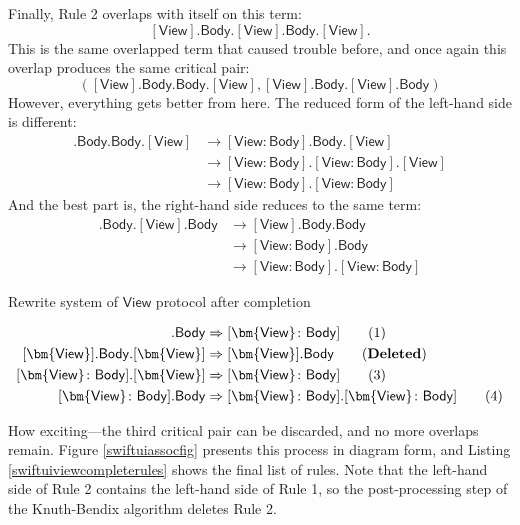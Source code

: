 \documentclass[headsepline,bibliography=totoc]{scrreport}
\newcommand{\namesym}[1]{\mathsf{#1}}
\newcommand{\proto}[1]{\bm{\mathsf{#1}}}
\newcommand{\protosym}[1]{[\proto{#1}]}
\newcommand{\assocsym}[2]{[\proto{#1}\colon\namesym{#2}]}
\theoremstyle{definition}
\theoremstyle{definition}
\theoremstyle{definition}
\begin{document}
Finally, Rule 2 overlaps with itself on this term:
\[\protosym{View}.\namesym{Body}.\protosym{View}.\namesym{Body}.\protosym{View}.\]
This is the same overlapped term that caused trouble before, and once again this overlap produces the same critical pair:
\[(\protosym{View}.\namesym{Body}.\namesym{Body}.\protosym{View}, \protosym{View}.\namesym{Body}.\protosym{View}.\namesym{Body})\]
However, everything gets better from here. The reduced form of the left-hand side is different:
\begin{align}
\protosym{View}.\namesym{Body}.\namesym{Body}.\protosym{View}
&\rightarrow\assocsym{View}{Body}.\namesym{Body}.\protosym{View}\tag{Rule 1}\\
&\rightarrow\assocsym{View}{Body}.\assocsym{View}{Body}.\protosym{View}\tag{Rule 4}\\
&\rightarrow\assocsym{View}{Body}.\assocsym{View}{Body}\tag{Rule 3}
\end{align}
And the best part is, the right-hand side reduces to the same term:
\begin{align}
\protosym{View}.\namesym{Body}.\protosym{View}.\namesym{Body}
&\rightarrow\protosym{View}.\namesym{Body}.\namesym{Body}\tag{Rule 2}\\
&\rightarrow\assocsym{View}{Body}.\namesym{Body}\tag{Rule 4}\\
&\rightarrow\assocsym{View}{Body}.\assocsym{View}{Body}\tag{Rule 3}
\end{align}
\begin{listing}\caption{Rewrite system of $\proto{View}$ protocol after completion}\label{swiftuiviewcompleterules}
\begin{align}
\protosym{View}.\namesym{Body}&\Rightarrow\assocsym{View}{Body}\tag{1}\\
\protosym{View}.\namesym{Body}.\protosym{View}&\Rightarrow\protosym{View}.\namesym{Body}\tag{\textbf{Deleted}}\\
\assocsym{View}{Body}.\protosym{View}&\Rightarrow\assocsym{View}{Body}\tag{3}\\
\assocsym{View}{Body}.\namesym{Body}&\Rightarrow\assocsym{View}{Body}.\assocsym{View}{Body}\tag{4}
\end{align}
\end{listing}
How exciting---the third critical pair can be discarded, and no more overlaps remain. Figure \ref{swiftuiassocfig} presents this process in diagram form, and Listing \ref{swiftuiviewcompleterules} shows the final list of rules. Note that the left-hand side of Rule 2 contains the left-hand side of Rule 1, so the post-processing step of the Knuth-Bendix algorithm deletes Rule 2.
\end{document}
